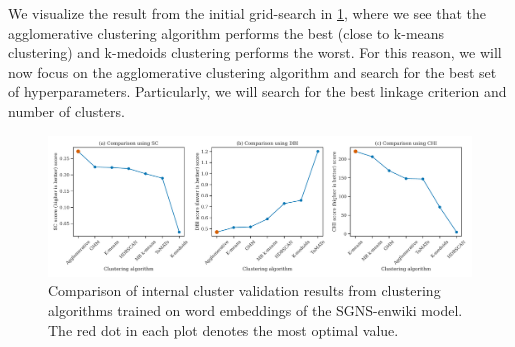 We visualize the result from the initial grid-search in \cref{fig:cluster-analysis-comparison-internal-cluster-validation}, where we see that the agglomerative clustering algorithm performs the best (close to k-means clustering) and k-medoids clustering performs the worst. For this reason, we will now focus on the agglomerative clustering algorithm and search for the best set of hyperparameters. Particularly, we will search for the best linkage criterion and number of clusters.
\begin{figure}[H]
    \centering
    \includegraphics[width=\textwidth]{thesis/figures/cluster-analysis-comparison-internal-cluster-validation.pdf}
    \caption{Comparison of internal cluster validation results from clustering algorithms trained on word embeddings of the SGNS-enwiki model. The red dot in each plot denotes the most optimal value.}
    \label{fig:cluster-analysis-comparison-internal-cluster-validation}
\end{figure}

